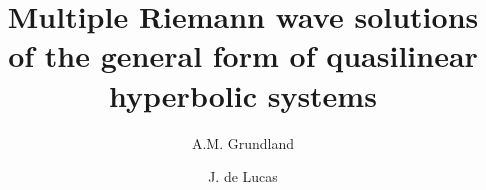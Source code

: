 \documentclass{birkjour}
\theoremstyle{definition}
\theoremstyle{remark}
\numberwithin{equation}{section}
\numberwithin{equation}{section}
\numberwithin{thm}{section}
\numberwithin{equation}{section}
\numberwithin{thm}{section}
\begin{document}






\title[]
{Multiple Riemann wave solutions of the general form of quasilinear hyperbolic systems}



\author[A.M. Grundland]{A.M. Grundland}
\address{Centre de Recherches Math\'ematiques, Universit\'e de Montr\'eal,\\
	Succ. Centre-Ville, CP 6128, Montr\'eal (QC) H3C 3J7, Canada \\
	Department of Mathematics and Computer Science, Universit\'e du Qu\'ebec, 
	CP 500, Trois-Rivi\`eres (QC) G9A 5H7, Canada.}




\author{J. de Lucas}
\address{Department of Mathematical Methods in Physics, University of Warsaw, \\ ul. Pasteura 5, 02-093, Warszawa, Poland.}


\date{}

\end{document}
